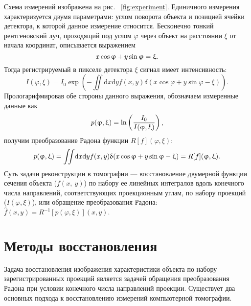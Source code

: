 Схема измерений изображена на рис. ~\ref{fig:experiment}.
Единичного измерения характеризуется двумя параметрами: углом поворота объекта и позицией ячейки детектора, к которой данное измерение относится.
Бесконечно тонкий рентгеновский луч, проходящий под углом $\varphi$  через объект на расстоянии $\xi$  от начала координат, описывается выражением
\begin{equation}\notag
  x\cos\varphi + y\sin\varphi = \xi.
\end{equation}
Тогда регистрируемый в пикселе детектора $\xi$ сигнал имеет интенсивность:
\begin{equation}\label{eq:mono_fp}
  I(\varphi, \xi) = I_0 \exp\left( {-\iint \! \mathrm d x \mathrm d y f(x,y)\delta(x\cos\varphi + y\sin\varphi - \xi)}\right).
\end{equation}
Прологарифмировав обе стороны данного выражения, обозначаем измеренные данные как
\begin{equation}\notag
  p(\varphi, \xi) = \ln \left (\frac{I_0}{I(\varphi, \xi)} \right),
\end{equation}
получим преобразование Радона функции $R[f](\varphi, \xi)$:
\begin{equation}\notag
  p(\varphi, \xi)= \iint \! \mathrm d x \mathrm d y f(x,y)\delta(x\cos\varphi + y\sin\varphi - \xi) = R[f](\varphi, \xi).
\end{equation}
Суть задачи реконструкции в томографии --- восстановление двумерной функции сечения объекта ($f(x,\ y)$) по набору ее линейных интегралов вдоль конечного числа направлений, соответствующих проекционным углам, по набору проекций ($I(\varphi, \xi)$), или обращение преобразования Радона: $\hat{f}(x, y) = R^{-1}[p(\varphi, \xi)](x, y)$.

\section{Методы восстановления}
Задача восстановления изображения характеристики объекта по набору зарегистрированных проекций является задачей обращения преобразования Радона при условии конечного числа направлений проекции.
Существует два основных подхода к восстановлению измерений компьютерной томографии.

